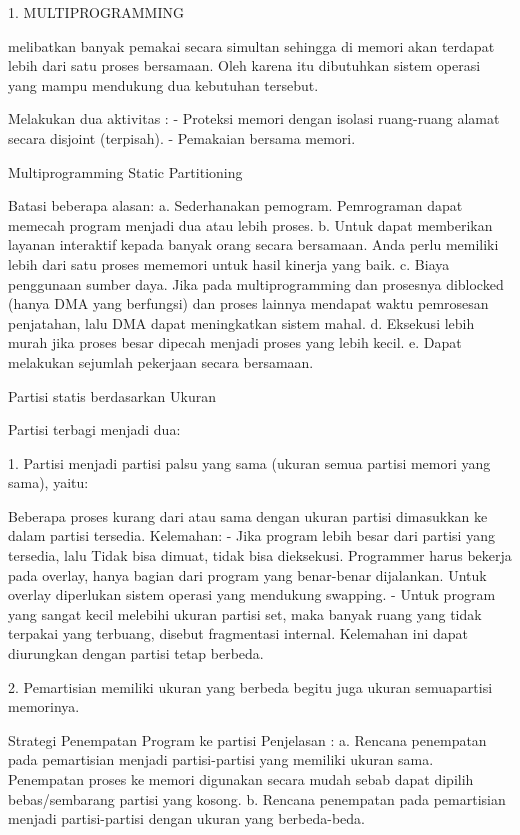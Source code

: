 1. MULTIPROGRAMMING

melibatkan banyak pemakai secara simultan sehingga di memori akan terdapat lebih dari satu proses bersamaan. Oleh karena itu dibutuhkan sistem operasi yang mampu mendukung dua kebutuhan tersebut.

Melakukan dua aktivitas :
- Proteksi memori dengan isolasi ruang-ruang alamat secara disjoint (terpisah).
- Pemakaian bersama memori.

Multiprogramming Static Partitioning

Batasi beberapa alasan:
a. Sederhanakan pemogram.
Pemrograman dapat memecah program menjadi dua atau lebih proses.
b. Untuk dapat memberikan layanan interaktif kepada banyak orang secara bersamaan.
Anda perlu memiliki lebih dari satu proses mememori
untuk hasil kinerja yang baik.
c. Biaya penggunaan sumber daya.
Jika pada multiprogramming dan prosesnya diblocked (hanya DMA
yang berfungsi) dan proses lainnya mendapat waktu pemrosesan penjatahan, lalu DMA
dapat meningkatkan sistem mahal.
d. Eksekusi lebih murah jika proses besar dipecah menjadi proses yang lebih kecil.
e. Dapat melakukan sejumlah pekerjaan secara bersamaan.


Partisi statis berdasarkan Ukuran

Partisi terbagi menjadi dua:

1. Partisi menjadi partisi palsu yang sama (ukuran semua partisi
memori yang sama), yaitu:

Beberapa proses kurang dari atau sama dengan ukuran partisi
dimasukkan ke dalam
partisi tersedia.
Kelemahan:
- Jika program lebih besar dari partisi yang tersedia, lalu
Tidak bisa dimuat, tidak bisa dieksekusi. Programmer harus bekerja pada overlay, hanya bagian dari program yang benar-benar dijalankan. Untuk overlay diperlukan sistem operasi yang mendukung swapping.
- Untuk program yang sangat kecil melebihi ukuran partisi
set, maka banyak ruang yang tidak terpakai yang terbuang,
disebut fragmentasi internal. Kelemahan ini dapat diurungkan dengan
partisi tetap berbeda.

2. Pemartisian memiliki ukuran yang berbeda begitu juga ukuran semuapartisi memorinya.

Strategi Penempatan Program ke partisi
Penjelasan :
a. Rencana penempatan pada pemartisian menjadi partisi-partisi yang memiliki ukuran sama. Penempatan proses ke memori digunakan secara mudah sebab dapat dipilih bebas/sembarang partisi yang kosong.
b. Rencana penempatan pada pemartisian menjadi partisi-partisi dengan ukuran yang berbeda-beda.

